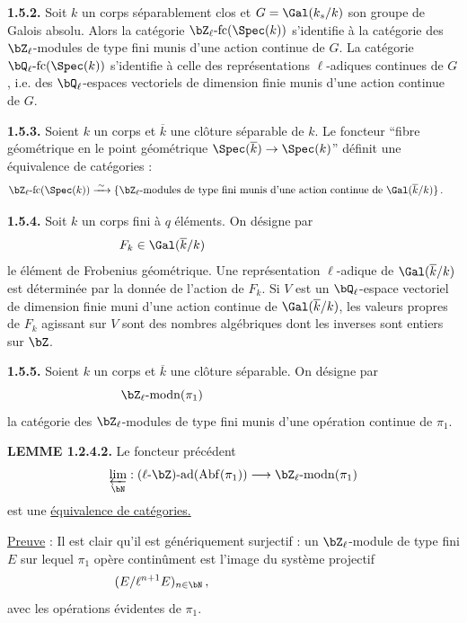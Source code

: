 \smallskip

\noindent
\textbf{1.5.2.} Soit $k$ un corps s\'eparablement clos et $G = \Gal(k_s/k)$ son groupe de Galois absolu. Alors la cat\'egorie $\bZ_{\ell}\text{-fc}(\Spec(k))$ s'identifie \`a la cat\'egorie des $\bZ_{\ell}$-modules de type fini munis d'une action continue de $G$. La cat\'egorie $\bQ_{\ell}\text{-fc}(\Spec(k))$ s'identifie \`a celle des repr\'esentations $\ell$-adiques continues de $G$, i.e. des $\bQ_{\ell}$-espaces vectoriels de dimension finie munis d'une action continue de $G$.

\smallskip

\noindent
\textbf{1.5.3.} Soient $k$ un corps et $\overline{k}$ une cl\^oture s\'eparable de $k$. Le foncteur ``fibre g\'eom\'etrique en le point g\'eom\'etrique $\Spec(\overline{k}) \rightarrow \Spec(k)$'' d\'efinit une \'equivalence de cat\'egories :
\[
\bZ_{\ell}\text{-fc}(\Spec(k)) \xrightarrow{\;\sim\;} \{\bZ_{\ell}\text{-modules de type fini munis d'une action continue de } \Gal(\overline{k}/k)\}\,.\hspace*{0.5cm}
\]

\smallskip

\noindent
\textbf{1.5.4.} Soit $k$ un corps fini \`a $q$ \'el\'ements. On d\'esigne par
\[
F_k \in \Gal(\overline{k}/k)\hspace*{4cm}
\]
le \'el\'ement de Frobenius g\'eom\'etrique. Une repr\'esentation $\ell$-adique de $\Gal(\overline{k}/k)$ est d\'etermin\'ee par la donn\'ee de l'action de $F_k$. Si $V$ est un $\bQ_{\ell}$-espace vectoriel de dimension finie muni d'une action continue de $\Gal(\overline{k}/k)$, les valeurs propres de $F_k$ agissant sur $V$ sont des nombres alg\'ebriques dont les inverses sont entiers sur $\bZ$.

\smallskip

\noindent
\textbf{1.5.5.} Soient $k$ un corps et $\overline{k}$ une cl\^oture s\'eparable. On d\'esigne par
\[
\bZ_{\ell}\text{-}\mathrm{modn}(\pi_1)\hspace*{4cm}
\]
la cat\'egorie des $\bZ_{\ell}$-modules de type fini munis d'une op\'eration continue de $\pi_1$.

\smallskip

\noindent
\textbf{LEMME 1.2.4.2.} Le foncteur pr\'ec\'edent
\[
\varprojlim_{\bN} : (\ell\text{-}\bZ)\text{-ad}(\mathrm{Abf}(\pi_1)) \longrightarrow \bZ_{\ell}\text{-}\mathrm{modn}(\pi_1)
\]
est une \underline{\'equivalence de cat\'egories.}

\smallskip

\noindent
\underline{Preuve} : Il est clair qu'il est g\'en\'eriquement surjectif : un $\bZ_{\ell}$-module de type fini $E$ sur lequel $\pi_1$ op\`ere contin\^ument est l'image du syst\`eme projectif
\[
(E/\ell^{n+1}E)_{n \in \bN}\,,\hspace*{4cm}
\]
avec les op\'erations \'evidentes de $\pi_1$.

